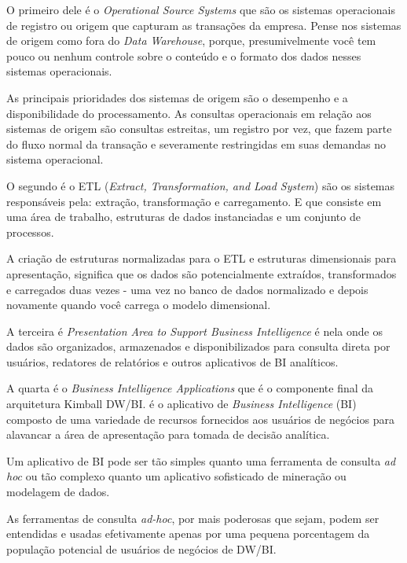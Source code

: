 O primeiro dele \'{e} o \textit{Operational Source Systems} que s\~{a}o os sistemas operacionais de registro ou origem que capturam as transa\c{c}ões da empresa. Pense nos sistemas de origem como fora do \textit{Data Warehouse}, porque, presumivelmente você tem pouco ou nenhum controle sobre o conteúdo e o formato dos dados nesses sistemas operacionais. 

As principais prioridades dos sistemas de origem s\~{a}o o desempenho e a disponibilidade do processamento. As consultas operacionais em rela\c{c}\~{a}o aos sistemas de origem s\~{a}o consultas estreitas, um registro por vez, que fazem parte do fluxo normal da transa\c{c}\~{a}o e severamente restringidas em suas demandas no sistema operacional.

O segundo \'{e} o ETL (\textit{Extract, Transformation, and Load System}) s\~{a}o os sistemas respons\'{a}veis pela: extra\c{c}\~{a}o, transforma\c{c}\~{a}o e carregamento. E que consiste em uma \'{a}rea de trabalho, estruturas de dados instanciadas e um conjunto de processos.

A cria\c{c}\~{a}o de estruturas normalizadas para o ETL e estruturas dimensionais para apresenta\c{c}\~{a}o, significa que os dados s\~{a}o potencialmente extraídos, transformados e carregados duas vezes - uma vez no banco de dados normalizado e depois novamente quando você carrega o modelo dimensional. 

A terceira \'{e} \textit{Presentation Area to Support Business Intelligence} \'{e} nela onde os dados s\~{a}o organizados, armazenados e disponibilizados para consulta direta por usu\'{a}rios, redatores de relatórios e outros aplicativos de BI analíticos.

A quarta \'{e} o \textit{Business Intelligence Applications} que \'{e} o componente final da arquitetura Kimball DW/BI. \'{e} o aplicativo de \textit{Business Intelligence} (BI) composto de uma variedade de recursos fornecidos aos usu\'{a}rios de negócios para alavancar a \'{a}rea de apresenta\c{c}\~{a}o para tomada de decis\~{a}o analítica.

Um aplicativo de BI pode ser t\~{a}o simples quanto uma ferramenta de consulta \textit{ad hoc} ou t\~{a}o complexo quanto um aplicativo sofisticado de minera\c{c}\~{a}o ou modelagem de dados. 

As ferramentas de consulta \textit{ad-hoc}, por mais poderosas que sejam, podem ser entendidas e usadas efetivamente apenas por uma pequena porcentagem da popula\c{c}\~{a}o potencial de usu\'{a}rios de negócios de DW/BI. 

